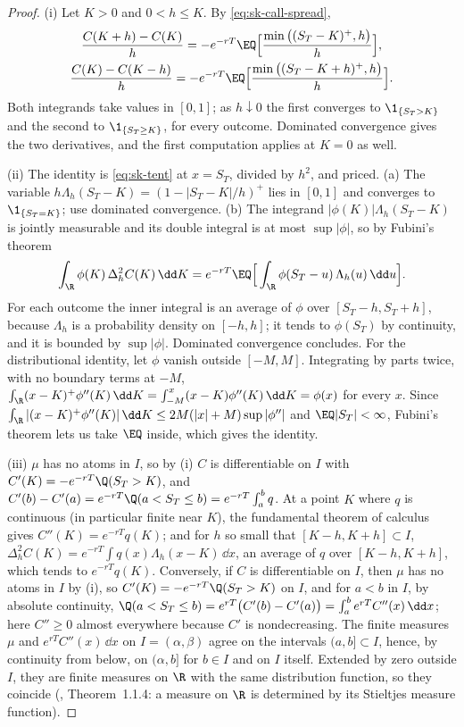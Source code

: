 \begin{proof}
(i) Let $K>0$ and $0<h\le K$. By \eqref{eq:sk-call-spread},
\begin{gather*}
  \frac{C(K+h)-C(K)}{h}=-e^{-rT}\EQ\Big[\frac{\min\big((S_T-K)^+,h\big)}h\Big],\\
  \frac{C(K)-C(K-h)}{h}=-e^{-rT}\EQ\Big[\frac{\min\big((S_T-K+h)^+,h\big)}h\Big].
\end{gather*}
Both integrands take values in $[0,1]$; as $h\downarrow0$ the first converges to $\1_{\{S_T>K\}}$ and
the second to $\1_{\{S_T\ge K\}}$, for every outcome. Dominated convergence gives the two
derivatives, and the first computation applies at $K=0$ as well.

(ii) The identity is \eqref{eq:sk-tent} at $x=S_T$, divided by $h^2$, and priced. (a) The variable
$h\Lambda_h(S_T-K)=(1-|S_T-K|/h)^+$ lies in $[0,1]$ and converges to $\1_{\{S_T=K\}}$; use dominated
convergence. (b) The integrand $|\phi(K)|\Lambda_h(S_T-K)$ is jointly measurable and its double
integral is at most $\sup|\phi|$, so by Fubini's theorem
\[
  \int_\R\phi(K)\,\Delta_h^2C(K)\,\dd K=e^{-rT}\EQ\Big[\int_\R\phi(S_T-u)\,\Lambda_h(u)\,\dd u\Big].
\]
For each outcome the inner integral is an average of $\phi$ over $[S_T-h,S_T+h]$, because $\Lambda_h$ is
a probability density on $[-h,h]$; it tends to $\phi(S_T)$ by continuity, and it is bounded by
$\sup|\phi|$. Dominated convergence concludes. For the distributional identity, let $\phi$ vanish
outside $[-M,M]$. Integrating by parts twice, with no boundary terms at $-M$,
$\int_\R(x-K)^+\phi''(K)\,\dd K=\int_{-M}^x(x-K)\phi''(K)\,\dd K=\phi(x)$ for every $x$. Since
$\int_\R|(x-K)^+\phi''(K)|\,\dd K\le2M(|x|+M)\sup|\phi''|$ and $\EQ|S_T|<\infty$, Fubini's theorem
lets us take $\EQ$ inside, which gives the identity.

(iii) $\mu$ has no atoms in $I$, so by (i) $C$ is differentiable on $I$ with
$C'(K)=-e^{-rT}\Q(S_T>K)$, and $C'(b)-C'(a)=e^{-rT}\Q(a<S_T\le b)=e^{-rT}\int_a^bq$. At a point $K$
where $q$ is continuous (in particular finite near $K$), the fundamental theorem of calculus gives
$C''(K)=e^{-rT}q(K)$; and for $h$ so small that $[K-h,K+h]\subset I$,
$\Delta_h^2C(K)=e^{-rT}\int q(x)\Lambda_h(x-K)\,\dd x$, an average of $q$ over $[K-h,K+h]$, which tends
to $e^{-rT}q(K)$. Conversely, if $C$ is differentiable on $I$, then $\mu$ has no atoms in $I$ by (i),
so $C'(K)=-e^{-rT}\Q(S_T>K)$ on $I$, and for $a<b$ in $I$, by absolute continuity,
$\Q(a<S_T\le b)=e^{rT}\big(C'(b)-C'(a)\big)=\int_a^be^{rT}C''(x)\,\dd x$; here $C''\ge0$ almost everywhere
because $C'$ is nondecreasing. The finite measures $\mu$ and $e^{rT}C''(x)\,\dd x$ on $I=(\alpha,\beta)$ agree on the
intervals $(a,b]\subset I$, hence, by continuity from below, on $(\alpha,b]$ for $b\in I$ and on $I$ itself.
Extended by zero outside $I$, they are finite measures on $\R$ with the same distribution function, so
they coincide (\textcite{durrett}, Theorem~1.1.4: a measure on $\R$ is determined by its Stieltjes
measure function).


\end{proof}
